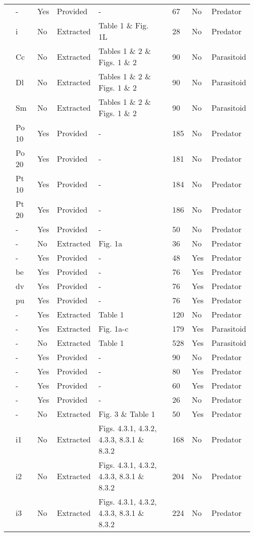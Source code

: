 \begin{longtable}{lllllllll}
\citet{Kratina:2009aa}&-&Yes&Provided&-&\citet{Kratina:2020aa}&67&No&Predator\tabularnewline
\citet{Krylov:1992aa}&i&No&Extracted&Table 1 \& Fig. 1L&\citet{Novak:2020aa}&28&No&Predator\tabularnewline
\citet{Kumar:1985aa}&Cc&No&Extracted&Tables 1 \& 2 \& Figs. 1 \& 2&\citet{Novak:2020aa}&90&No&Parasitoid\tabularnewline
\citet{Kumar:1985aa}&Dl&No&Extracted&Tables 1 \& 2 \& Figs. 1 \& 2&\citet{Novak:2020aa}&90&No&Parasitoid\tabularnewline
\citet{Kumar:1985aa}&Sm&No&Extracted&Tables 1 \& 2 \& Figs. 1 \& 2&\citet{Novak:2020aa}&90&No&Parasitoid\tabularnewline
\citet{Lang:2012aa}&Po 10&Yes&Provided&-&\citet{Lang:2020aa}&185&No&Predator\tabularnewline
\citet{Lang:2012aa}&Po 20&Yes&Provided&-&\citet{Lang:2020aa}&181&No&Predator\tabularnewline
\citet{Lang:2012aa}&Pt 10&Yes&Provided&-&\citet{Lang:2020aa}&184&No&Predator\tabularnewline
\citet{Lang:2012aa}&Pt 20&Yes&Provided&-&\citet{Lang:2020aa}&186&No&Predator\tabularnewline
\citet{Long:2012aa}&-&Yes&Provided&-&\citet{Long:2020aa}&50&No&Predator\tabularnewline
\citet{Mansour:1991aa}&-&No&Extracted&Fig. 1a&\citet{Novak:2020aa}&36&No&Predator\tabularnewline
\citet{Medoc:2013aa}&-&Yes&Provided&-&\citet{Medoc:2020aa}&48&Yes&Predator\tabularnewline
\citet{Medoc:2015aa}&be&Yes&Provided&-&\citet{Medoc:2020ab}&76&Yes&Predator\tabularnewline
\citet{Medoc:2015aa}&dv&Yes&Provided&-&\citet{Medoc:2020ab}&76&Yes&Predator\tabularnewline
\citet{Medoc:2015aa}&pu&Yes&Provided&-&\citet{Medoc:2020ab}&76&Yes&Predator\tabularnewline
\citet{Mertz:1968aa}&-&Yes&Extracted&Table 1&\citet{Novak:2020aa}&120&No&Predator\tabularnewline
\citet{Mills:2004aa}&-&Yes&Extracted&Fig. 1a-c&\citet{Novak:2020aa}&179&Yes&Parasitoid\tabularnewline
\citet{Montoya:2000aa}&-&No&Extracted&Table 1&\citet{Novak:2020aa}&528&Yes&Parasitoid\tabularnewline
\citet{Omkar:2004aa}&-&Yes&Provided&-&\citet{Omkar:2004aa}&90&No&Predator\tabularnewline
\citet{Prokopenko:2017aa}&-&Yes&Provided&-&\citet{Prokopenko:2020aa}&80&Yes&Predator\tabularnewline
\citet{Pusack:2018aa}&-&Yes&Provided&-&\citet{Pusack:2020aa}&60&Yes&Predator\tabularnewline
\citet{Reeve:1997aa}&-&Yes&Provided&-&\citet{Reeve:2020aa}&26&No&Predator\tabularnewline
\citet{Salt:1974aa}&-&No&Extracted&Fig. 3 \& Table 1&\citet{Novak:2020aa}&50&Yes&Predator\tabularnewline
\citet{Uttley:1980aa}&i1&No&Extracted&Figs. 4.3.1, 4.3.2, 4.3.3, 8.3.1 \& 8.3.2&\citet{Novak:2020aa}&168&No&Predator\tabularnewline
\citet{Uttley:1980aa}&i2&No&Extracted&Figs. 4.3.1, 4.3.2, 4.3.3, 8.3.1 \& 8.3.2&\citet{Novak:2020aa}&204&No&Predator\tabularnewline
\citet{Uttley:1980aa}&i3&No&Extracted&Figs. 4.3.1, 4.3.2, 4.3.3, 8.3.1 \& 8.3.2&\citet{Novak:2020aa}&224&No&Predator\tabularnewline

\end{longtable}
